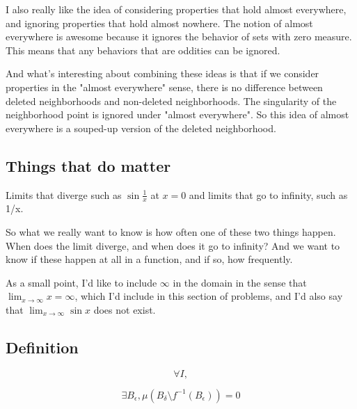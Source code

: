 \documentclass{article}
\begin{document}
I also really like the idea of considering properties that hold almost everywhere, and ignoring properties that hold almost nowhere. The notion of almost everywhere is awesome because it ignores the behavior of sets with zero measure. This means that any behaviors that are oddities can be ignored. 

And what's interesting about combining these ideas is that if we consider properties in the "almost everywhere" sense, there is no difference between deleted neighborhoods and non-deleted neighborhoods. The singularity of the neighborhood point is ignored under "almost everywhere".  So this idea of almost everywhere is a souped-up version of the deleted neighborhood.

\subsection{Things that do matter}
Limits that diverge such as $\sin \frac{1}{x}$ at $x=0$ and limits that go to infinity, such as 1/x. 

So what we really want to know is how often one of these two things happen. When does the limit diverge, and when does it go to infinity? And we want to know if these happen at all in a function, and if so, how frequently. 

As a small point, I'd like to include $\infty$ in the domain in the sense that $\displaystyle \lim_{x \to \infty} x = \infty$, which I'd include in this section of problems, and I'd also say that $\displaystyle \lim_{x \to \infty} \sin x$ does not exist.  

\subsection{Definition}

$$\forall I, $$

$$\exists B_{\epsilon} , \mu(B_{\delta} \setminus f^{-1}(B_\epsilon)) = 0$$
\end{document}
